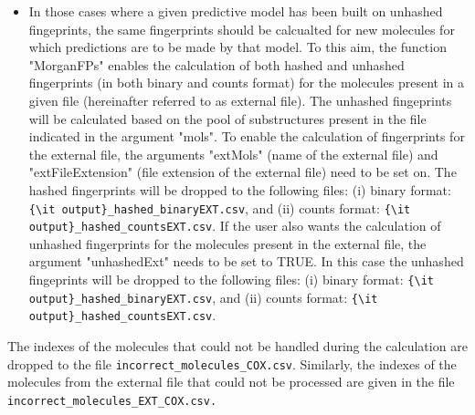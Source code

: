 \documentclass[twoside,a4wide,12pt]{article}\usepackage[]{graphicx}\usepackage[]{color}
\begin{document}
\begin{itemize}
\item In those cases where a given predictive model has been built on unhashed fingeprints, the same fingerprints should be 
calcualted for new molecules for which predictions are to be made by that model. 
To this aim, the function "MorganFPs" enables the calculation of both hashed and unhashed fingerprints (in both binary and counts format) for the molecules present in a given file (hereinafter referred to as external file). The unhashed fingeprints will be calculated based on the pool of substructures present in the file indicated in the argument "mols".
To enable the calculation of fingerprints for the external file, the arguments "extMols" (name of the external file) and "extFileExtension" (file extension of the external file) need to be set on. 
The hashed fingerprints will be dropped to the following files:
(i) binary format: \verb|{\it output}_hashed_binaryEXT.csv|, and (ii) counts format: \verb|{\it output}_hashed_countsEXT.csv|.
If the user also wants the calculation of unhashed fingerprints for the molecules present in the external file, the argument "unhashedExt" needs to be set to TRUE. 
In this case the unhashed fingeprints will be dropped to the following files:
(i) binary format: \verb|{\it output}_hashed_binaryEXT.csv|, and (ii) counts format: \verb|{\it output}_hashed_countsEXT.csv|.

\end{itemize}

The indexes of the molecules that could not be handled during the calculation are dropped to the file \verb|incorrect_molecules_COX.csv|. Similarly, the indexes of the molecules from the external file that could not be processed are given in the file \verb|incorrect_molecules_EXT_COX.csv.|
\end{document}
